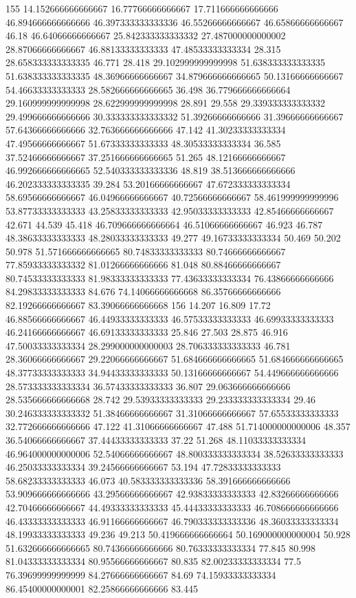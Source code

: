 155 14.152666666666667 16.77766666666667 17.711666666666666 46.894666666666666 46.397333333333336 46.55266666666667 46.65866666666667 46.18 46.64066666666667 25.842333333333332 27.487000000000002 28.87066666666667 46.88133333333333 47.48533333333334 28.315 28.658333333333335 46.771 28.418 29.102999999999998 51.638333333333335 51.638333333333335 48.36966666666667 34.879666666666665 50.13166666666667 54.46633333333333 28.582666666666665 36.498 36.779666666666664 29.160999999999998 28.622999999999998 28.891 29.558 29.339333333333332 29.499666666666666 30.333333333333332 51.39266666666666 31.39666666666667 57.64366666666666 32.763666666666666 47.142 41.30233333333334 47.49566666666667 51.67333333333333 48.30533333333334 36.585 37.52466666666667 37.251666666666665 51.265 48.12166666666667 46.992666666666665 52.540333333333336 48.819 38.513666666666666 46.202333333333335 39.284 53.20166666666667 47.672333333333334 58.69566666666667 46.04966666666667 40.72566666666667 58.461999999999996 53.87733333333333 43.25833333333333 42.95033333333333 42.85466666666667 42.671 44.539 45.418 46.709666666666664 46.51066666666667 46.923 46.787 48.38633333333333 48.28033333333333 49.277 49.16733333333334 50.469 50.202 50.978 51.571666666666665 80.74833333333333 80.74666666666667 77.85933333333332 81.01266666666666 81.048 80.88466666666667 80.74533333333333 81.98333333333333 77.43633333333334 76.43866666666666 84.29833333333333 84.676 74.14066666666668 86.35766666666666 82.19266666666667 83.39066666666668
156 14.207 16.809 17.72 46.88566666666667 46.44933333333333 46.57533333333333 46.69933333333333 46.24166666666667 46.69133333333333 25.846 27.503 28.875 46.916 47.50033333333334 28.299000000000003 28.706333333333333 46.781 28.36066666666667 29.22066666666667 51.684666666666665 51.684666666666665 48.37733333333333 34.94433333333333 50.13166666666667 54.449666666666666 28.573333333333334 36.57433333333333 36.807 29.063666666666666 28.535666666666668 28.742 29.53933333333333 29.233333333333334 29.46 30.246333333333332 51.38466666666667 31.31066666666667 57.65533333333333 32.772666666666666 47.122 41.31066666666667 47.488 51.714000000000006 48.357 36.54066666666667 37.44433333333333 37.22 51.268 48.11033333333334 46.964000000000006 52.54066666666667 48.800333333333334 38.52633333333333 46.25033333333334 39.24566666666667 53.194 47.72833333333333 58.68233333333333 46.073 40.583333333333336 58.391666666666666 53.909666666666666 43.29566666666667 42.93833333333333 42.83266666666666 42.70466666666667 44.49333333333333 45.44433333333333 46.708666666666666 46.43333333333333 46.91166666666667 46.790333333333336 48.36033333333334 48.19933333333333 49.236 49.213 50.419666666666664 50.169000000000004 50.928 51.632666666666665 80.74366666666666 80.76333333333334 77.845 80.998 81.04333333333334 80.95566666666667 80.835 82.00233333333334 77.5 76.39699999999999 84.27666666666667 84.69 74.15933333333334 86.45400000000001 82.25866666666666 83.445
